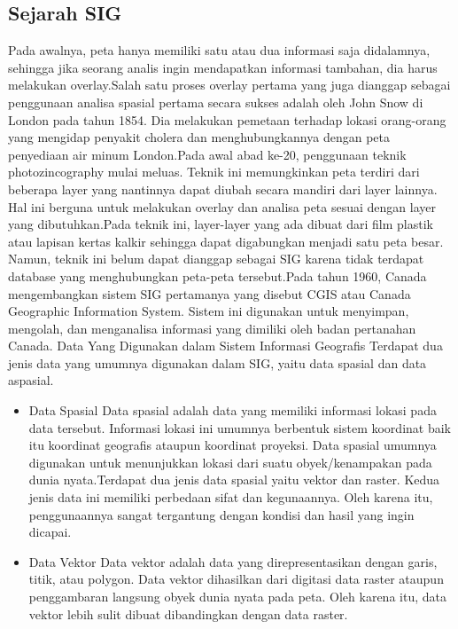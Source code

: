 \subsection{Sejarah SIG}
Pada awalnya, peta hanya memiliki satu atau dua informasi saja didalamnya, sehingga jika seorang analis ingin mendapatkan informasi tambahan, dia harus melakukan overlay.Salah satu proses overlay pertama yang juga dianggap sebagai penggunaan analisa spasial pertama secara sukses adalah oleh John Snow di London pada tahun 1854. Dia melakukan pemetaan terhadap lokasi orang-orang yang mengidap penyakit cholera dan menghubungkannya dengan peta penyediaan air minum London.Pada awal abad ke-20, penggunaan teknik photozincography mulai meluas. Teknik ini memungkinkan peta terdiri dari beberapa layer yang nantinnya dapat diubah secara mandiri dari layer lainnya. Hal ini berguna untuk melakukan overlay dan analisa peta sesuai dengan layer yang dibutuhkan.Pada teknik ini, layer-layer yang ada dibuat dari film plastik atau lapisan kertas kalkir sehingga dapat digabungkan menjadi satu peta besar. Namun, teknik ini belum dapat dianggap sebagai SIG karena tidak terdapat database yang menghubungkan peta-peta tersebut.Pada tahun 1960, Canada mengembangkan sistem SIG pertamanya yang disebut CGIS atau Canada Geographic Information System. Sistem ini digunakan untuk menyimpan, mengolah, dan menganalisa informasi yang dimiliki oleh badan pertanahan Canada.
Data Yang Digunakan dalam Sistem Informasi Geografis
Terdapat dua jenis data yang umumnya digunakan dalam SIG, yaitu data spasial dan data aspasial.
\begin{itemize}
	\item Data Spasial
	Data spasial adalah data yang memiliki informasi lokasi pada data tersebut. Informasi lokasi ini umumnya berbentuk sistem koordinat baik itu koordinat geografis ataupun koordinat proyeksi.
Data spasial umumnya digunakan untuk menunjukkan lokasi dari suatu obyek/kenampakan pada dunia nyata.Terdapat dua jenis data spasial yaitu vektor dan raster. Kedua jenis data ini memiliki perbedaan sifat dan kegunaannya. Oleh karena itu, penggunaannya sangat tergantung dengan kondisi dan hasil yang ingin dicapai.

	\item Data Vektor
	Data vektor adalah data yang direpresentasikan dengan garis, titik, atau polygon. Data vektor dihasilkan dari digitasi data raster ataupun penggambaran langsung obyek dunia nyata pada peta. Oleh karena itu, data vektor lebih sulit dibuat dibandingkan dengan data raster.
	
\end{itemize}
